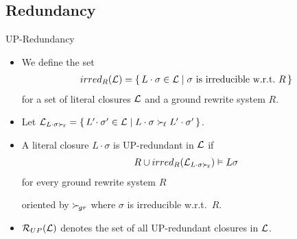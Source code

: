\documentclass[%
handout,
]{beamer}
\begin{document}
\subsection{Redundancy}
\begin{frame}{UP-Redundancy}
    \begin{itemize}
        \item
    We define the set
    \begin{gather*}
        irred_R(\mathcal{L}) =
        \{\,
        L\cdot\sigma\in\mathcal{L} \mid
        \sigma\text{ is irreducible w.r.t.~}R
        \,\}
    \end{gather*}
    for a set of literal closures $\mathcal{L}$
    and a ground rewrite system $R$.

    \vspace{0.7em}
    \item Let
    $
    \mathcal{L}_{L\cdot\sigma\mathrel\succ_{\!\ell}} =
    \{\,
    L'\!\cdot\sigma'\in\mathcal{L} \mid
    L\cdot\sigma\mathrel\succ_{\!\ell} L'\cdot\sigma'
    \,\}
    $.

    \vspace{0.7em}
    \item A literal closure $L\cdot\sigma$ is UP-redundant in $\mathcal{L}$ if
    \begin{gather*}
        R \cup irred_R(\mathcal{L}_{L\cdot\sigma\mathrel\succ_{\!\ell}}) \vDash L\sigma
    \end{gather*}
    for every ground rewrite system $R$

    oriented by $\mathrel\succ_{\!gr}$
    where $\sigma$ is irreducible w.r.t.~$R$.

    \vspace{0.7em}
    \item
    $\mathcal{R}_{UP}(\mathcal{L})$ denotes the set of all UP-redundant closures in $\mathcal{L}$.
\end{itemize}
\end{frame}
\end{document}
